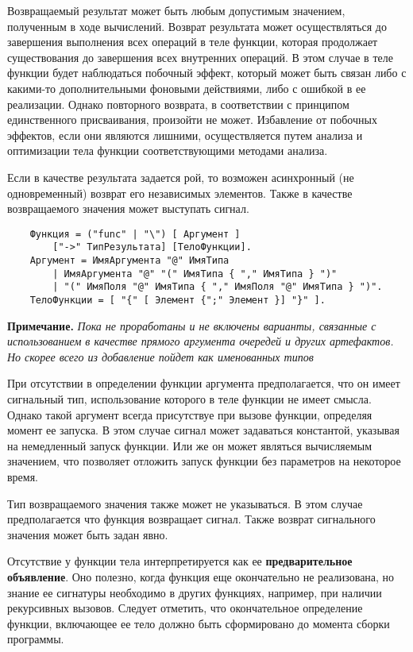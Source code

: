 {Возвращаемый результат может быть любым допустимым значением, полученным в ходе вычислений. Возврат результата может осуществляться до завершения выполнения всех операций в теле функции, которая продолжает существования до завершения всех внутренних операций. В этом случае в теле функции будет наблюдаться побочный эффект, который может быть связан либо с какими-то дополнительными фоновыми действиями, либо с ошибкой в ее реализации. Однако повторного возврата, в соответствии с принципом единственного присваивания, произойти не может. Избавление от побочных эффектов, если они являются лишними, осуществляется путем анализа и оптимизации тела функции соответствующими методами анализа.

Если в качестве результата задается рой, то возможен асинхронный (не одновременный) возврат его независимых элементов. Также в качестве возвращаемого значения может выступать сигнал.

\begin{verbatim}
    Функция = ("func" | "\") [ Аргумент ]
        ["->" ТипРезультата] [ТелоФункции].
    Аргумент = ИмяАргумента "@" ИмяТипа
        | ИмяАргумента "@" "(" ИмяТипа { "," ИмяТипа } ")"
        | "(" ИмяПоля "@" ИмяТипа { "," ИмяПоля "@" ИмяТипа } ")".
    ТелоФункции = [ "{" [ Элемент {";" Элемент }] "}" ].
\end{verbatim}

\textbf{Примечание.}
\textit{Пока не проработаны и не включены варианты, связанные с использованием в качестве прямого аргумента очередей и других артефактов. Но скорее всего из добавление пойдет как именованных типов}

При отсутствии в определении функции аргумента предполагается, что он имеет сигнальный тип, использование которого в теле функции не имеет смысла. Однако такой аргумент всегда присутствуе при вызове функции, определяя момент ее запуска. В этом случае сигнал может задаваться константой, указывая на немедленный запуск функции. Или же он может являться вычисляемым значением, что позволяет отложить запуск функции без параметров на некоторое время.

Тип возвращаемого значения также может не указываться. В этом случае предполагается что функция возвращает сигнал. Также возврат сигнального значения может быть задан явно.

Отсутствие у функции тела интерпретируется как ее \textbf{предварительное объявление}. Оно полезно, когда функция еще окончательно не реализована, но знание ее сигнатуры необходимо в других функциях, например, при наличии рекурсивных вызовов. Следует отметить, что окончательное определение функции, включающее ее тело должно быть сформировано до момента сборки программы.

}
